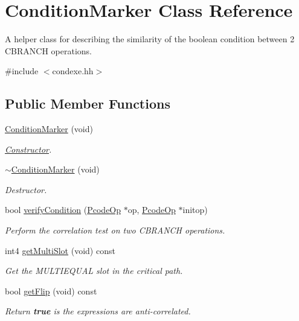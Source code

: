 \hypertarget{class_condition_marker}{}\section{Condition\+Marker Class Reference}
\label{class_condition_marker}


A helper class for describing the similarity of the boolean condition between 2 C\+B\+R\+A\+N\+CH operations.  




{\ttfamily \#include $<$condexe.\+hh$>$}

\subsection*{Public Member Functions}
\begin{DoxyCompactItemize}
\item 
\mbox{\hyperlink{class_condition_marker_ac532df69b0e3b0b529b42f6871e59b85}{Condition\+Marker}} (void)
\begin{DoxyCompactList}\small\item\em \mbox{\hyperlink{class_constructor}{Constructor}}. \end{DoxyCompactList}\item 
\mbox{\hyperlink{class_condition_marker_aea2636ea1affecfc44cb4aa0c00e8350}{$\sim$\+Condition\+Marker}} (void)
\begin{DoxyCompactList}\small\item\em Destructor. \end{DoxyCompactList}\item 
bool \mbox{\hyperlink{class_condition_marker_a46df93505aa04dd2d8b77239b272092f}{verify\+Condition}} (\mbox{\hyperlink{class_pcode_op}{Pcode\+Op}} $\ast$op, \mbox{\hyperlink{class_pcode_op}{Pcode\+Op}} $\ast$initop)
\begin{DoxyCompactList}\small\item\em Perform the correlation test on two C\+B\+R\+A\+N\+CH operations. \end{DoxyCompactList}\item 
int4 \mbox{\hyperlink{class_condition_marker_a60a5e69db5a456966011d29dadb62a6b}{get\+Multi\+Slot}} (void) const
\begin{DoxyCompactList}\small\item\em Get the M\+U\+L\+T\+I\+E\+Q\+U\+AL slot in the critical path. \end{DoxyCompactList}\item 
bool \mbox{\hyperlink{class_condition_marker_ac1a25557679f0be858c5bee6bd691b23}{get\+Flip}} (void) const
\begin{DoxyCompactList}\small\item\em Return {\bfseries{true}} is the expressions are anti-\/correlated. \end{DoxyCompactList}\end{DoxyCompactItemize}
